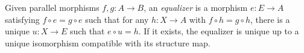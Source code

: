 
Given parallel morphisms $f,g:A\to B$, an \emph{equalizer} is a morphism $e:E\to A$ satisfying $f\circ e=g\circ e$ such that for any $h:X\to A$ with $f\circ h=g\circ h$, there is a unique $u:X\to E$ such that $e\circ u=h$. If it exists, the equalizer is unique up to a unique isomorphism compatible with its structure map.
